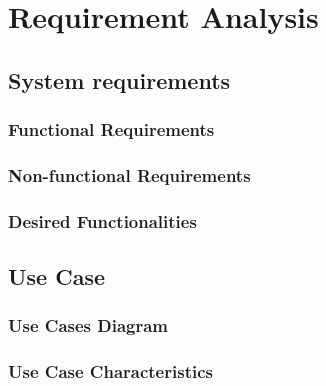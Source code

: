 \documentclass{article}
\begin{document}
\section{Requirement Analysis}
\subsection{System requirements}
\subsubsection{Functional Requirements}
\subsubsection{Non-functional Requirements}
\subsubsection{Desired Functionalities}

\subsection{Use Case}
\subsubsection{Use Cases Diagram}
\subsubsection{Use Case Characteristics}
\end{document}
